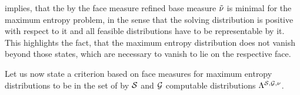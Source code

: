 
 implies, that the by the face measure refined base measure $\tilde{\nu}$ is minimal for the maximum entropy problem, in the sense that the solving distribution is positive with respect to it and all feasible distributions have to be representable by it.
This highlights the fact, that the maximum entropy distribution does not vanish beyond those states, which are necessary to vanish to lie on the respective face. %



Let us now state a criterion based on face measures for maximum entropy distributions to be in the set of by $\mathcal{S}$ and $\mathcal{G}$ computable distributions $\Lambda^{\mathcal{S},\mathcal{G},\nu}$.

